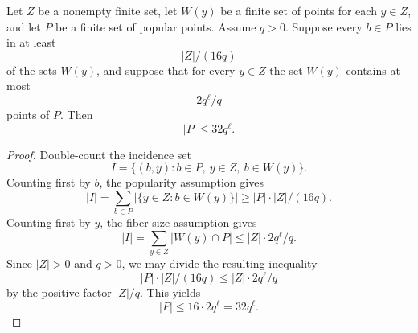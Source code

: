 \begin{helper}
Let \(Z\) be a nonempty finite set, let \(W(y)\) be a finite set of points
for each \(y\in Z\), and let \(P\) be a finite set of popular points.  Assume
\(q>0\).  Suppose every \(b\in P\) lies in at least
\[
  |Z|/(16q)
\]
of the sets \(W(y)\), and suppose that for every \(y\in Z\) the set
\(W(y)\) contains at most
\[
  2q^\ell/q
\]
points of \(P\).  Then
\[
  |P|\le 32q^\ell .
\]
\end{helper}
\begin{proof}
Double-count the incidence set
\[
  I=\{(b,y): b\in P,\ y\in Z,\ b\in W(y)\}.
\]
Counting first by \(b\), the popularity assumption gives
\[
  |I|=\sum_{b\in P}|\{y\in Z:b\in W(y)\}|
      \ge |P|\cdot |Z|/(16q).
\]
Counting first by \(y\), the fiber-size assumption gives
\[
  |I|=\sum_{y\in Z}|W(y)\cap P|
      \le |Z|\cdot 2q^\ell/q.
\]
Since \(|Z|>0\) and \(q>0\), we may divide the resulting inequality
\[
  |P|\cdot |Z|/(16q)\le |Z|\cdot 2q^\ell/q
\]
by the positive factor \(|Z|/q\).  This yields
\[
  |P|\le 16\cdot 2q^\ell=32q^\ell .
\]
\end{proof}
